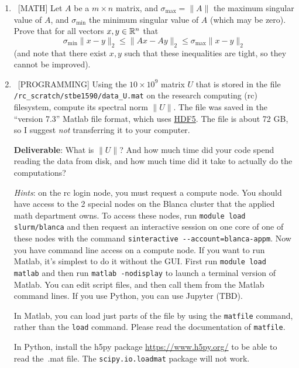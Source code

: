 \documentclass[10pt, letterpaper]{scrartcl}
\begin{document}
\begin{enumerate}[align=left, leftmargin=*, label=\bfseries Problem \arabic*:]   
 
    \item \ [MATH] Let $A$ be a $m \times n$ matrix, and $\sigma_{\max} = \|A\|$ the maximum singular value of $A$, and $\sigma_{\min}$ the minimum singular value of $A$ (which may be zero).  Prove that for all vectors $x,y\in \mathbb{R}^n$ that 
    \[
    \sigma_{\min} \| x-y\|_2 \le \|Ax-Ay\|_2 \le \sigma_{\max}\|x-y\|_2
    \]
    (and note that there exist $x,y$ such that these inequalities are tight, so they cannot be improved).
         
    \item \ [PROGRAMMING] Using the $10 \times 10^9$ matrix $U$ that is stored in the file \\ \texttt{/rc\_scratch/stbe1590/data\_U.mat} on the research computing (rc) filesystem, compute its spectral norm $\|U\|$.
    The file was saved in the ``version 7.3'' Matlab file format, which uses \href{https://www.hdfgroup.org/}{HDF5}.  The file is about 72 GB, so I suggest \emph{not} transferring it to your computer.

    \textbf{Deliverable}: What is $\|U\|$? And how much time did your code spend reading the data from disk, and how much time did it take to actually do the computations?
    
    \emph{Hints}: on the rc login node, you must request a compute node. You should have access to the 2 special nodes on the Blanca cluster that the applied math department owns. To access these nodes, run \texttt{module load slurm/blanca} and then request an interactive session on one core of one of these nodes with the command \texttt{sinteractive -{}-account=blanca-appm}.  Now you have command line access on a compute node.  If you want to run Matlab, it's simplest to do it without the GUI.  First run \texttt{module load matlab} and then run \texttt{matlab -nodisplay} to launch a terminal version of Matlab. You can edit script files, and then call them from the Matlab command lines.  If you use Python, you can use Jupyter (TBD).
    
    
    In Matlab, you can load just parts of the file by using the \texttt{matfile} command, rather than the \texttt{load} command. Please read the documentation of \texttt{matfile}.
    
    In Python, install the h5py package \url{https://www.h5py.org/} to be able to read the\ .mat file. The \texttt{scipy.io.loadmat} package will not work.
    

\end{enumerate}
\end{document}
